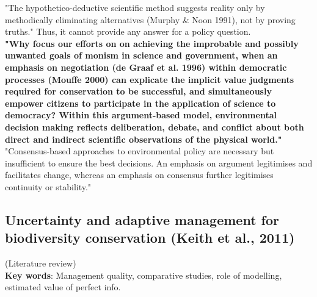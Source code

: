 \documentclass[12pt]{article}
\begin{document}
"The hypothetico-deductive scientific method suggests reality only by methodically eliminating alternatives (Murphy \& Noon 1991), not by proving truths." Thus, it cannot provide any answer for a policy question.\\
\textbf{"Why focus our efforts on on achieving the improbable and possibly unwanted goals
of monism in science and government, when an emphasis  on  negotiation  (de  Graaf  et  al.  1996) within democratic processes (Mouffe 2000) can explicate the implicit value judgments required for conservation to be successful, and simultaneously empower citizens to participate in the application of science to democracy? Within this argument-based model, environmental decision making reflects deliberation, debate, and conflict about both direct and indirect scientific observations of the physical world."}\\
"Consensus-based approaches to environmental  policy  are  necessary  but  insufficient  to  ensure the best decisions. An emphasis on argument legitimises and facilitates change, whereas an emphasis on consensus further legitimises continuity or stability."

\subsection{Uncertainty and adaptive management for biodiversity conservation (Keith et al., 2011)}

(Literature review)\\
\textbf{Key words}: Management quality, comparative studies, role of modelling, estimated value of perfect info.\\
\end{document}
